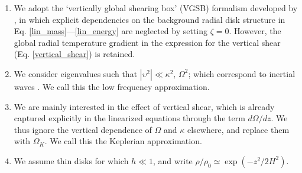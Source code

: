 \begin{enumerate}
  
\item  We adopt the  `vertically global shearing box' (VGSB) formalism 
  developed by , in which explicit dependencies on the
  background radial disk structure in 
  Eq. \ref{lin_mass}---\ref{lin_energy} are neglected by setting
  $\zeta=0$. However, the global radial temperature 
  gradient in the expression for the 
  vertical shear (Eq. \ref{vertical_shear}) is retained. 

\item We consider eigenvalues such that
  $|\upsilon^2|\ll \kappa^2,\,\Omega^2$; which correspond to inertial
  waves . We call this the low frequency  
  approximation. 

\item We are mainly interested in the effect of vertical shear, 
  which is already captured
  explicitly in the linearized equations through the term
  $d\Omega/dz$. We thus ignore the vertical dependence of $\Omega$ and
  $\kappa$ elsewhere, and replace them with
  $\Omega_K$.  We call this the Keplerian approximation. 
  
\item We assume thin disks for which $h\ll 1$, and write 
  $\rho/\rho_0\simeq  \exp{(-z^2/2H^2)}$. 

\end{enumerate}

